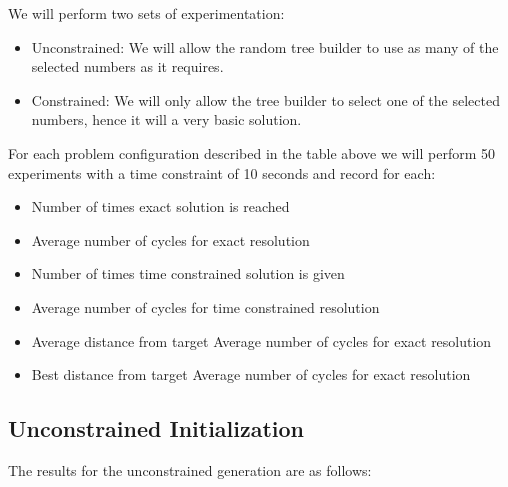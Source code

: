 \documentclass[a4paper,10pt,titlepage]{article}
\begin{document}
\par We will perform two sets of experimentation:
\begin{itemize}
	\item Unconstrained: We will allow the random tree builder to use as many of the selected numbers as it requires.
	\item Constrained: We will only allow the tree builder to select one of the selected numbers, hence it will a very basic solution.
\end{itemize}

\par For each problem configuration described in the table above we will perform 50 experiments with a time constraint of 10 seconds and record for each:
\begin{itemize}
	\item Number of times exact solution is reached 
	\item Average number of cycles for exact resolution
	\item Number of times time constrained solution is given
	\item Average number of cycles for time constrained resolution
	\item Average distance from target Average number of cycles for exact resolution
	\item Best distance from target Average number of cycles for exact resolution
\end{itemize}

\subsection{Unconstrained Initialization}

\par The results for the unconstrained generation are as follows:
\end{document}
